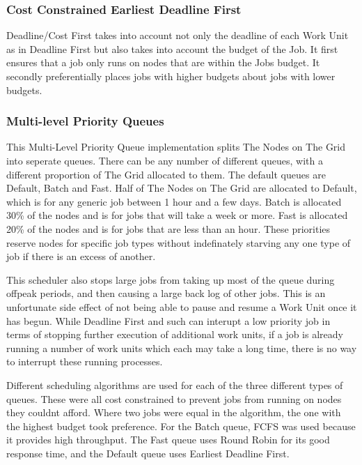 \subsubsection{Cost Constrained Earliest Deadline First}
Deadline/Cost First takes into account not only the deadline of each Work Unit as in Deadline First but also takes into account the budget of the Job. It first ensures that a job only runs on nodes that are within the Jobs budget. It secondly preferentially places jobs with higher budgets about jobs with lower budgets.

\subsubsection{Multi-level Priority Queues}
This Multi-Level Priority Queue implementation splits The Nodes on The Grid into seperate queues. There can be any number of different queues, with a different proportion of The Grid allocated to them. The default queues are Default, Batch and Fast. Half of The Nodes on The Grid are allocated to Default, which is for any generic job between 1 hour and a few days. Batch is allocated 30\% of the nodes and is for jobs that will take a week or more. Fast is allocated 20\% of the nodes and is for jobs that are less than an hour. These priorities reserve nodes for specific job types without indefinately starving any one type of job if there is an excess of another.

This scheduler also stops large jobs from taking up most of the queue during offpeak periods, and then causing a large back log of other jobs. This is an unfortunate side effect of not being able to pause and resume a Work Unit once it has begun. While Deadline First and such can interupt a low priority job in terms of stopping further execution of additional work units, if a job is already running a number of work units which each may take a long time, there is no way to interrupt these running processes.

Different scheduling algorithms are used for each of the three different types of queues. These were all cost constrained to prevent jobs from running on nodes they couldnt afford. Where two jobs were equal in the algorithm, the one with the highest budget took preference. For the Batch queue, FCFS was used because it provides high throughput. The Fast queue uses Round Robin for its good response time, and the Default queue uses Earliest Deadline First.

